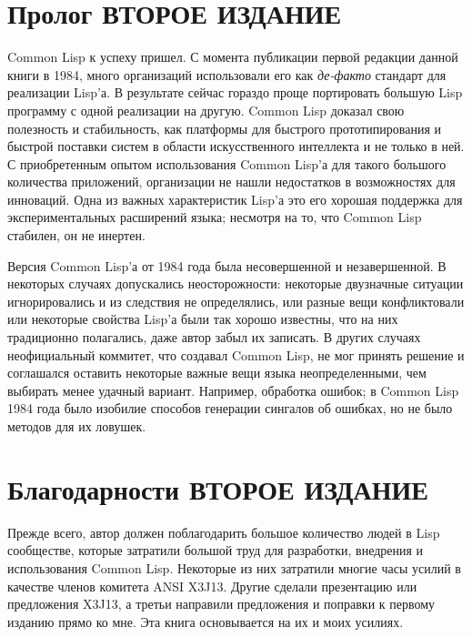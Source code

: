 \else

\chapter*{Пролог ВТОРОЕ ИЗДАНИЕ}

Common Lisp к успеху пришел. С момента публикации первой редакции
данной книги в 1984, много организаций использовали его как \emph{де-факто}
стандарт для реализации Lisp'а. В результате сейчас гораздо 
проще портировать большую Lisp программу с одной реализации на
другую. Common Lisp доказал свою полезность и стабильность, как
платформы для быстрого прототипирования и быстрой поставки систем в
области искусственного интеллекта и не только в ней. С приобретенным
опытом использования Common Lisp'а для такого большого количества
приложений, организации не нашли недостатков в возможностях для
инноваций. Одна из важных характеристик Lisp'а это его хорошая
поддержка для экспериментальных расширений языка; несмотря на то, что
Common Lisp стабилен, он не инертен.


Версия Common Lisp'а от 1984 года была несовершенной и
незавершенной. В некоторых случаях допускались неосторожности:
некоторые двузначные ситуации игнорировались и из следствия не
определялись, или разные вещи конфликтовали или некоторые свойства
Lisp'а были так хорошо известны, что на них традиционно
полагались, даже автор забыл их записать. В других случаях
неофициальный коммитет, что создавал Common Lisp, не мог принять
решение и соглашался оставить некоторые важные вещи языка
неопределенными, чем выбирать менее удачный вариант. Например,
обработка ошибок; в Common Lisp 1984 года было изобилие способов
генерации сингалов об ошибках, но не было методов для их ловушек. 


\chapter*{Благодарности ВТОРОЕ ИЗДАНИЕ}

Прежде всего, автор должен поблагодарить большое количество людей в Lisp
сообществе, которые затратили большой труд для разработки, внедрения и
использования Common Lisp. Некоторые из них затратили многие часы
усилий в качестве членов комитета ANSI X3J13. Другие
сделали презентацию или предложения X3J13, а третьи
направили предложения и поправки к первому изданию прямо ко мне.
Эта книга основывается на их и моих усилиях.


